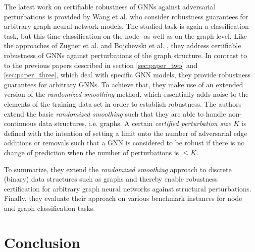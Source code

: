 \documentclass[a4paper,preprint]{sig-alternate}
\begin{document}
The latest work on certifiable robustness of GNNs against adversarial perturbations is provided by Wang et al. \cite{Wang_2020}
who consider robustness guarantees for arbitrary graph neural network models. The studied task is again a classification task,
but this time classification on the node- as well as on the graph-level.
Like the approaches of Zügner et al. \cite{10.1145/3394486.3403217} and Bojchevski et al. \cite{bojchevski2019certifiable},
they address certifiable robustness of GNNs against perturbations of the graph structure. 
In contrast to to the previous papers described in section \ref{sec:paper_two}
and \ref{sec:paper_three}, which deal with specific GNN models, they provide robustness guarantees for arbitrary GNNs.
To achieve that, they make use of an extended version of the \textit{randomized smoothing} method, which essentially adds noise 
to the elements of the training data set in order to establish robustness. \cite{Wang_2020}
The authors extend the basic \textit{randomized smoothing} such that they are able to handle non-continuous data structures, i.e. graphs.
A certain \textit{certified perturbation size} $K$ is defined with the intention of setting a limit onto the number of adversarial edge additions
or removals such that a GNN is considered to be robust if there is no change of prediction when the number of perturbations is $\leq K$. \cite{Wang_2020}\newline

To summarize, they extend the \textit{randomized smoothing} approach to discrete (binary) data structures such as graphs 
and thereby enable robustness certification for arbitrary graph neural networks against structural perturbations.
Finally, they evaluate their approach on various benchmark instances for node and graph classification tasks.

\section{Conclusion}
\label{sec:conclusion}
\end{document}
